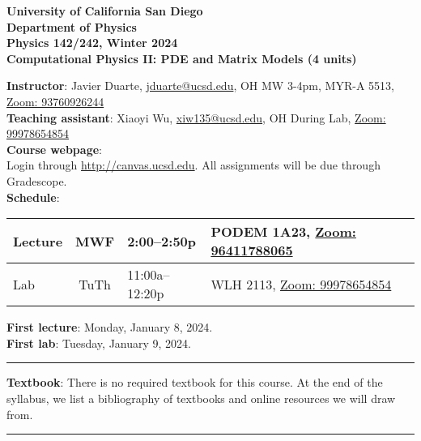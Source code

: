 \documentclass[12pt]{article}
\begin{document}
\begin{center}
  \textbf{
    University of California San Diego\\
    Department of Physics\\
    Physics 142/242, Winter 2024\\
    Computational Physics II: PDE and Matrix Models (4 units)
  }
\end{center}

\noindent\textbf{Instructor}: Javier Duarte, \href{mailto:jduarte@ucsd.edu}{jduarte@ucsd.edu}, OH MW 3-4pm, MYR-A 5513, \href{https://ucsd.zoom.us/j/93760926244}{Zoom: 93760926244}\\
\noindent \textbf{Teaching assistant}: Xiaoyi Wu, \href{mailto:xiw135@ucsd.edu}{xiw135@ucsd.edu}, OH During Lab, \href{https://ucsd.zoom.us/j/99978654854}{Zoom: 99978654854}\\

\noindent\textbf{Course webpage}:\\
\hspace*{1cm}Login through \href{http://canvas.ucsd.edu}{http://canvas.ucsd.edu}.
All assignments will be due through Gradescope.\\

\noindent\textbf{Schedule}:
\begin{center}
  \begin{tabular}{|l|c|l|m{90mm}|}
    \hline
    Lecture & MWF  & 2:00--2:50p    & PODEM 1A23, \href{https://ucsd.zoom.us/j/96411788065}{Zoom: 96411788065} \\\hline
    Lab     & TuTh & 11:00a--12:20p & WLH 2113, \href{https://ucsd.zoom.us/j/99978654854}{Zoom: 99978654854}   \\\hline\end{tabular}
\end{center}

\noindent\textbf{First lecture}: Monday, January 8, 2024.\\
\textbf{First lab}: Tuesday, January 9, 2024.

\begin{center}
  \rule{\textwidth}{0.5pt}
\end{center}

\noindent\textbf{Textbook}: There is no required textbook for this course.
At the end of the syllabus, we list a bibliography of textbooks and online resources we will draw from.

\begin{center}
  \rule{\textwidth}{0.5pt}
\end{center}
\end{document}
